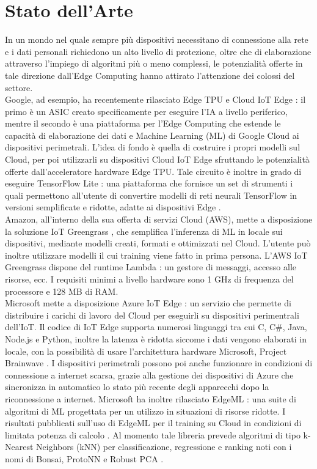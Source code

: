 \chapter{Stato dell'Arte}
In un mondo nel quale sempre più dispositivi necessitano di connessione alla rete e i dati personali richiedono un alto livello di protezione, oltre che di elaborazione attraverso l'impiego di algoritmi più o meno complessi, le potenzialità offerte in tale direzione dall'Edge Computing hanno attirato l'attenzione dei colossi del settore.\\ Google, ad esempio, ha recentemente rilasciato Edge TPU e Cloud IoT Edge \cite{iotgoogle}: il primo è un ASIC creato specificamente per eseguire l'IA a livello periferico, mentre il secondo è una piattaforma per l'Edge Computing che estende le capacità di elaborazione dei dati e Machine Learning (ML) di Google Cloud ai dispositivi perimetrali. L'idea di fondo è quella di costruire i propri modelli sul Cloud, per poi utilizzarli su dispositivi Cloud IoT Edge sfruttando le potenzialità offerte dall'acceleratore hardware Edge TPU. Tale circuito è inoltre in grado di eseguire TensorFlow Lite \cite{tflowlite}: una piattaforma che fornisce un set di strumenti i quali permettono all'utente di convertire modelli di reti neurali TensorFlow in versioni semplificate e ridotte, adatte ai dispositivi Edge \cite{tflowres}.\\
Amazon, all'interno della sua offerta di servizi Cloud (AWS), mette a disposizione la soluzione IoT Greengrass \cite{aws}, che semplifica l'inferenza di ML in locale sui dispositivi, mediante modelli creati, formati e ottimizzati nel Cloud. L'utente può inoltre utilizzare modelli il cui training viene fatto in prima persona. L'AWS IoT Greengrass dispone del runtime Lambda \cite{lambda}: un gestore di messaggi, accesso alle risorse, ecc. I requisiti minimi a livello hardware sono 1 GHz di frequenza del processore e 128 MB di RAM.\\
Microsoft mette a disposizione Azure IoT Edge \cite{azure}: un servizio che permette di distribuire i carichi di lavoro del Cloud per eseguirli su dispositivi perimentrali dell'IoT. Il codice di IoT Edge supporta numerosi linguaggi tra cui C, C\#, Java, Node.js e Python, inoltre la latenza è ridotta siccome i dati vengono elaborati in locale, con la possibilità di usare l'architettura hardware Microsoft, Project Brainwave \cite{bwave}. I dispositivi perimetrali possono poi anche funzionare in condizioni di connessione a internet scarsa, grazie alla gestione dei dispositivi di Azure che sincronizza in automatico lo stato più recente degli apparecchi dopo la riconnessione a internet. Microsoft ha inoltre rilasciato EdgeML \cite{edgeml}: una suite di algoritmi di ML progettata per un utilizzo in situazioni di risorse ridotte. I risultati pubblicati sull'uso di EdgeML per il training su Cloud in condizioni di limitata potenza di calcolo \cite{edgemlres}. Al momento tale libreria prevede algoritmi di tipo k-Nearest Neighbors (kNN) per classificazione, regressione e ranking noti con i nomi di Bonsai, ProtoNN e Robust PCA \cite{edgemlalg}.\\ 

